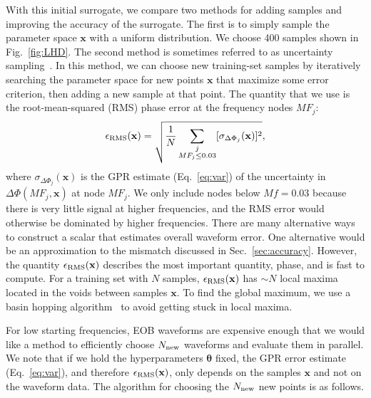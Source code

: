 \documentclass[prd,aps,letter,twocolumn,floatfix,notitlepage,nofootinbib]{revtex4-1}
\def\bx{\mathbf{x}}
\def\btheta{\boldsymbol{\theta}}
\begin{document}
With this initial surrogate, we compare two methods for adding samples and improving the accuracy of the surrogate. The first is to simply sample the parameter space $\bx$ with a uniform distribution. We choose 400 samples shown in Fig.~\ref{fig:LHD}. The second method is sometimes referred to as uncertainty sampling~\cite{BrochuCoraDeFreitas2010}. In this method, we can choose new training-set samples by iteratively searching the parameter space for new points ${\bm x}$ that maximize some error criterion, then adding a new sample at that point. The quantity that we use is the root-mean-squared (RMS) phase error at the frequency nodes $MF_j$:
\begin{equation}
\epsilon_{\rm RMS}(\bx) = \sqrt{\frac{1}{N} \sum_{ \substack{j \\ MF_j \le 0.03} } [\sigma_{\Delta\Phi_j}(\bx)]^2},
\label{eq:errorrms}
\end{equation}
where $\sigma_{\Delta\Phi_j}(\bx)$ is the GPR estimate (Eq.~\eqref{eq:var}) of the uncertainty in $\Delta\Phi(MF_j, \bx)$ at node $MF_j$. We only include nodes below $Mf=0.03$ because there is very little signal at higher frequencies, and the RMS error would otherwise be dominated by higher frequencies. There are many alternative ways to construct a scalar that estimates overall waveform error. One alternative would be an approximation to the mismatch discussed in Sec.~\ref{sec:accuracy}. However, the quantity $\epsilon_{\rm RMS}(\bx)$ describes the most important quantity, phase, and is fast to compute. For a training set with $N$ samples, $\epsilon_{\rm RMS}(\bx)$ has $\sim N$ local maxima located in the voids between samples $\bx$. To find the global maximum, we use a basin hopping algorithm~\cite{WalesDoye1998, scipy:basinhopping} to avoid getting stuck in local maxima.

For low starting frequencies, EOB waveforms are expensive enough that we would like a method to efficiently choose $N_{\rm new}$ waveforms and evaluate them in parallel. We note that if we hold the hyperparameters $\btheta$ fixed, the GPR error estimate (Eq.~\eqref{eq:var}), and therefore $\epsilon_{\rm RMS}(\bx)$, only depends on the samples $\bx$ and not on the waveform data. The algorithm for choosing the $N_{\rm new}$ new points is as follows.
\end{document}
